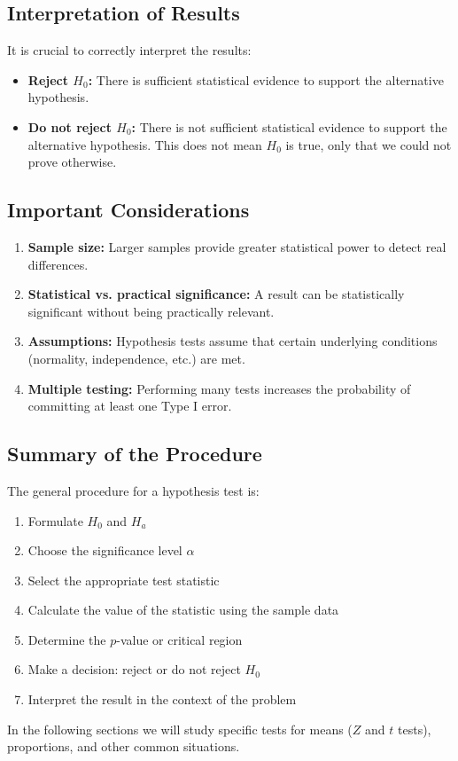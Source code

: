 \subsection{Interpretation of Results}

It is crucial to correctly interpret the results:

\begin{itemize}
	\item \textbf{Reject $H_0$:} There is sufficient statistical evidence to support the alternative hypothesis.
	
	\item \textbf{Do not reject $H_0$:} There is not sufficient statistical evidence to support the alternative hypothesis. This does not mean $H_0$ is true, only that we could not prove otherwise.
\end{itemize}

\subsection{Important Considerations}

\begin{enumerate}
	\item \textbf{Sample size:} Larger samples provide greater statistical power to detect real differences.
	
	\item \textbf{Statistical vs. practical significance:} A result can be statistically significant without being practically relevant.
	
	\item \textbf{Assumptions:} Hypothesis tests assume that certain underlying conditions (normality, independence, etc.) are met.
	
	\item \textbf{Multiple testing:} Performing many tests increases the probability of committing at least one Type I error.
\end{enumerate}

\subsection{Summary of the Procedure}

The general procedure for a hypothesis test is:

\begin{enumerate}
	\item Formulate $H_0$ and $H_a$
	\item Choose the significance level $\alpha$
	\item Select the appropriate test statistic
	\item Calculate the value of the statistic using the sample data
	\item Determine the $p$-value or critical region
	\item Make a decision: reject or do not reject $H_0$
	\item Interpret the result in the context of the problem
\end{enumerate}

In the following sections we will study specific tests for means ($Z$ and $t$ tests), proportions, and other common situations.
